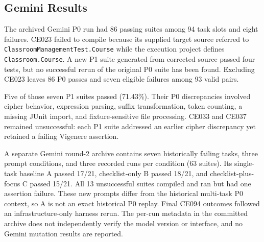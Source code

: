 \subsection{Gemini Results}
\label{subsec:gemini_results}
The archived Gemini P0 run had 86 passing suites among 94 task slots and eight failures. CE023 failed to compile because its supplied target source referred to \texttt{ClassroomManagementTest.Course} while the execution project defines \texttt{Classroom.Course}. A new P1 suite generated from corrected source passed four tests, but no successful rerun of the original P0 suite has been found. Excluding CE023 leaves 86 P0 passes and seven eligible failures among 93 valid pairs.

Five of those seven P1 suites passed (71.43\%). Their P0 discrepancies involved cipher behavior, expression parsing, suffix transformation, token counting, a missing JUnit import, and fixture-sensitive file processing. CE033 and CE037 remained unsuccessful: each P1 suite addressed an earlier cipher discrepancy yet retained a failing Vigenere assertion.

A separate Gemini round-2 archive contains seven historically failing tasks, three prompt conditions, and three recorded runs per condition (63 suites). Its single-task baseline A passed 17/21, checklist-only B passed 18/21, and checklist-plus-focus C passed 15/21. All 13 unsuccessful suites compiled and ran but had one assertion failure. These new prompts differ from the historical multi-task P0 context, so A is not an exact historical P0 replay. Final CE094 outcomes followed an infrastructure-only harness rerun. The per-run metadata in the committed archive does not independently verify the model version or interface, and no Gemini mutation results are reported.
